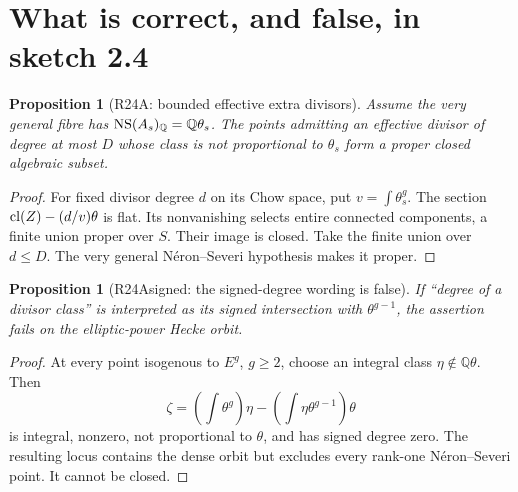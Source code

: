 \documentclass[11pt,a4paper]{article}
\newtheorem{proposition}[theorem]{Proposition}
\theoremstyle{definition}\newtheorem{definition}[theorem]{Definition}
\theoremstyle{remark}\newtheorem{remark}[theorem]{Remark}
\newcommand{\Q}{\mathbb Q}\newcommand{\Z}{\mathbb Z}\newcommand{\C}{\mathbb C}\newcommand{\R}{\mathbb R}
\begin{document}
\section{What is correct, and false, in sketch 2.4}
\begin{proposition}[R24A: bounded effective extra divisors]\label{R24A}
Assume the very general fibre has $\NS(A_s)_\Q=\Q\theta_s$. The points admitting an effective divisor of degree at most $D$ whose class is not proportional to $\theta_s$ form a proper closed algebraic subset.
\end{proposition}
\begin{proof}
For fixed divisor degree $d$ on its Chow space, put $v=\int\theta_s^g$. The section $\operatorname{cl}(Z)-(d/v)\theta$ is flat. Its nonvanishing selects entire connected components, a finite union proper over $S$. Their image is closed. Take the finite union over $d\le D$. The very general N\'eron--Severi hypothesis makes it proper.
\end{proof}

\begin{proposition}[R24Asigned: the signed-degree wording is false]\label{R24Asigned}
If ``degree of a divisor class'' is interpreted as its signed intersection with $\theta^{g-1}$, the assertion fails on the elliptic-power Hecke orbit.
\end{proposition}
\begin{proof}
At every point isogenous to $E^g$, $g\ge2$, choose an integral class $\eta\notin\Q\theta$. Then
\[
 \zeta=\left(\int\theta^g\right)\eta
       -\left(\int\eta\theta^{g-1}\right)\theta
\]
is integral, nonzero, not proportional to $\theta$, and has signed degree zero. The resulting locus contains the dense orbit but excludes every rank-one N\'eron--Severi point. It cannot be closed.
\end{proof}
\end{document}
